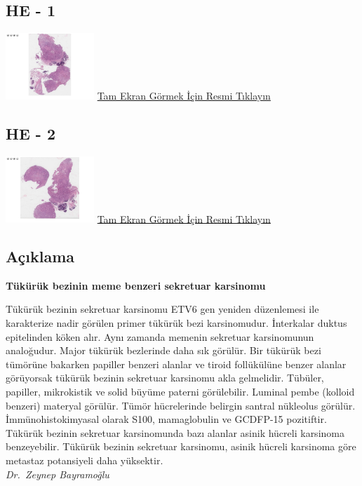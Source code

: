 \documentclass[
  letterpaper,
  DIV=11,
  numbers=noendperiod]{scrreprt}
\begin{document}
\hypertarget{he---1-3}{%
\subsection{HE - 1}\label{he---1-3}}

\href{https://images.patolojiatlasi.com/mammary-analogue-secretory-carcinoma/HE1.html}{\includegraphics[width=0.25\textwidth,height=\textheight]{./screenshots/thumbnail_mammary-analogue-secretory-carcinoma1.png}}
\href{https://images.patolojiatlasi.com/mammary-analogue-secretory-carcinoma/HE1.html}{Tam
Ekran Görmek İçin Resmi Tıklayın}

\hypertarget{he---2-3}{%
\subsection{HE - 2}\label{he---2-3}}

\href{https://images.patolojiatlasi.com/mammary-analogue-secretory-carcinoma/HE2.html}{\includegraphics[width=0.25\textwidth,height=\textheight]{./screenshots/thumbnail_mammary-analogue-secretory-carcinoma2.png}}
\href{https://images.patolojiatlasi.com/mammary-analogue-secretory-carcinoma/HE2.html}{Tam
Ekran Görmek İçin Resmi Tıklayın}

\hypertarget{auxe7ux131klama}{%
\subsection{Açıklama}\label{auxe7ux131klama}}

\textbf{Tükürük bezinin meme benzeri sekretuar karsinomu}

Tükürük bezinin sekretuar karsinomu ETV6 gen yeniden düzenlemesi ile
karakterize nadir görülen primer tükürük bezi karsinomudur. İnterkalar
duktus epitelinden köken alır. Aynı zamanda memenin sekretuar
karsinomunun analoğudur. Major tükürük bezlerinde daha sık görülür. Bir
tükürük bezi tümörüne bakarken papiller benzeri alanlar ve tiroid
follükülüne benzer alanlar görüyorsak tükürük bezinin sekretuar
karsinomu akla gelmelidir. Tübüler, papiller, mikrokistik ve solid
büyüme paterni görülebilir. Luminal pembe (kolloid benzeri) materyal
görülür. Tümör hücrelerinde belirgin santral nükleolus görülür.
İmmünohistokimyasal olarak S100, mamaglobulin ve GCDFP-15 pozitiftir.
Tükürük bezinin sekretuar karsinomunda bazı alanlar asinik hücreli
karsinoma benzeyebilir. Tükürük bezinin sekretuar karsinomu, asinik
hücreli karsinoma göre metastaz potansiyeli daha yüksektir.\\
\emph{Dr.~Zeynep Bayramoğlu}
\end{document}
